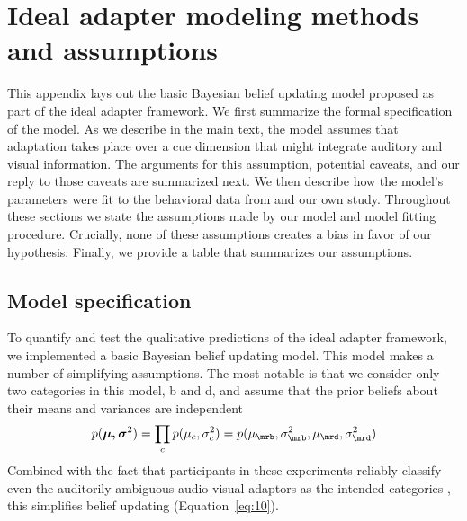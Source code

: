
\chapter{Ideal adapter modeling methods and assumptions}\label{chap:ideal-adapter-appendix}

This appendix lays out the basic Bayesian belief updating model proposed as part of the ideal adapter framework. %
We first summarize the formal specification of the model. As we describe in the main text, the model assumes that adaptation takes place over a cue dimension that might integrate auditory and visual information. The arguments for this assumption, potential caveats, and our reply to those caveats are summarized
next. We then %
describe how the model's parameters were fit to the behavioral data from \textcite{Vroomen2007} and our own study. Throughout these sections we state the assumptions made by our model and model fitting procedure. Crucially, none of these assumptions creates a bias in favor of our hypothesis. Finally, we provide a table that summarizes our assumptions.

\section{Model specification}
\label{sec:model-fitting-methods}

To quantify and test the qualitative predictions of the ideal adapter framework, we implemented a basic Bayesian belief updating model.  This model makes a number of simplifying assumptions. The most notable is that we consider only two categories in this model, \ph b and \ph d, and assume that the prior beliefs about their means and variances are independent
\begin{equation}
  \label{eq:21}
  p(\boldsymbol{\mu, \sigma}^2) = \prod_c p(\mu_c, \sigma^2_c) = p(\mu_\mrb, \sigma^2_\mrb, \mu_\mrd, \sigma^2_\mrd)
\end{equation}
Combined with the fact that participants in these experiments reliably classify even the auditorily ambiguous audio-visual adaptors as the intended categories \autocite{Vroomen2004}, this simplifies belief updating (Equation~\ref{eq:10}).

